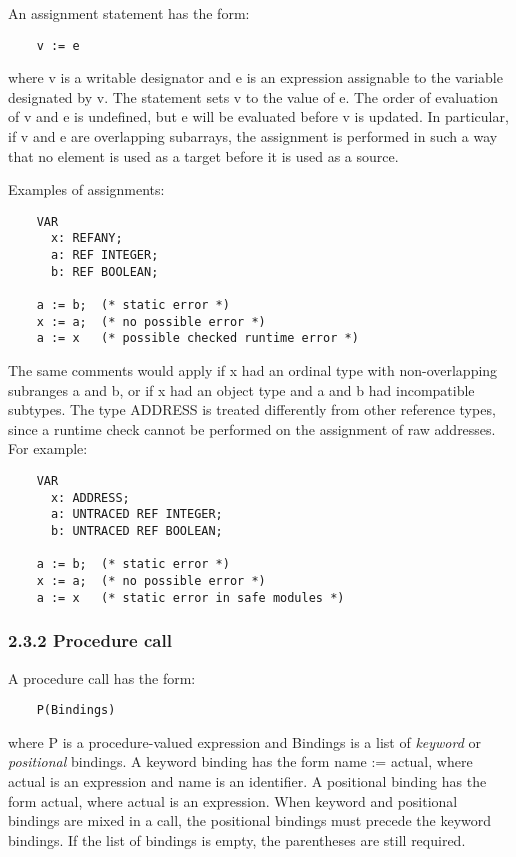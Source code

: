 \documentclass[10pt]{article}
\begin{document}
 An assignment statement has the form: 
\begin{verbatim}
    v := e
\end{verbatim}
 where v is a writable designator and e is an expression assignable to the variable designated by v. The statement sets v to the value of e. The order of evaluation of v and e is undefined, but e will be evaluated before v is updated. In particular, if v and e are overlapping subarrays, the assignment is performed in such a way that no element is used as a target before it is used as a source. 


  Examples of assignments: 
\begin{verbatim}
    VAR
      x: REFANY;
      a: REF INTEGER;
      b: REF BOOLEAN;

    a := b;  (* static error *)
    x := a;  (* no possible error *)
    a := x   (* possible checked runtime error *)
\end{verbatim}



 The same comments would apply if x had an ordinal type with non-overlapping subranges a and b, or if x had an object type and a and b had incompatible subtypes. The type ADDRESS is treated differently from other reference types, since a runtime check cannot be performed on the assignment of raw addresses. For example: 
\begin{verbatim}
    VAR
      x: ADDRESS;
      a: UNTRACED REF INTEGER;
      b: UNTRACED REF BOOLEAN;

    a := b;  (* static error *)
    x := a;  (* no possible error *)
    a := x   (* static error in safe modules *)
\end{verbatim}



 
\subsubsection*{2.3.2 Procedure call}


  A procedure call has the form: 
\begin{verbatim}
    P(Bindings)
\end{verbatim}
 where P is a procedure-valued expression and Bindings is a list of \emph{keyword}
 or \emph{positional}
 bindings. A keyword binding has the form name := actual, where actual is an expression and name is an identifier. A positional binding has the form actual, where actual is an expression. When keyword and positional bindings are mixed in a call, the positional bindings must precede the keyword bindings. If the list of bindings is empty, the parentheses are still required. 
\end{document}
